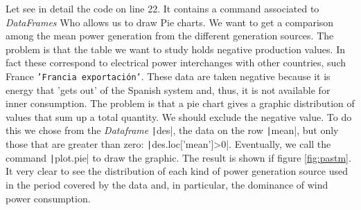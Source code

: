 \begin{paracol}{2}
Let see in detail the code on line 22. It contains a command associated to \emph{DataFrames} Who allows us to draw Pie charts. We want to get a comparison among the mean power generation from the different generation sources. The problem is that the table we want to study holds negative production values. In fact these correspond to electrical power interchanges with other countries, such France \texttt{'Francia exportación'}. These data are taken negative because it is energy that 'gets out' of the Spanish system and, thus, it is not available for inner consumption. The problem is that a pie chart gives a graphic distribution of values that sum up a total quantity. We should exclude the negative value. To do this we chose from the  \emph{Dataframe} \texttt|des|, the data on the row \texttt|mean|, but only those that are greater than zero: \texttt|des.loc['mean']>0|. Eventually, we call the command \texttt|plot.pie| to draw the graphic. The result is shown if figure \ref{fig:pastm}. It very clear to see the distribution of each kind of power generation source used in the period covered by the data and, in particular, the dominance of wind power consumption.       
\end{paracol}
	 	
